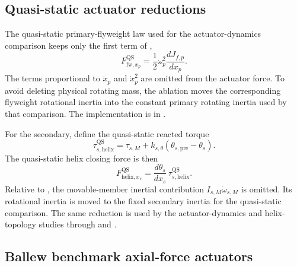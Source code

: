 \documentclass[11pt]{report}
\numberwithin{equation}{section}
\begin{document}
\subsection{Quasi-static actuator reductions}
\label{app:results_quasistatic_actuators}

The quasi-static primary-flyweight law used for the actuator-dynamics
comparison keeps only the first term of
,
\begin{equation}
F_{\mathrm{fw},x_p}^{\mathrm{QS}}
=
\frac{1}{2}\omega_p^2\frac{dJ_{f,p}}{dx_p}.
\label{eq:results_qs_flyweight_force}
\end{equation}
The terms proportional to \(\ddot x_p\) and \(\dot x_p^2\) are omitted from
the actuator force. To avoid deleting physical rotating mass, the ablation
moves the corresponding flyweight rotational inertia into the constant
primary rotating inertia used by that comparison. The implementation is in
.

For the secondary, define the quasi-static reacted torque
\begin{equation}
\tau_{s,\mathrm{helix}}^{\mathrm{QS}}
=
\tau_{s,M}
+k_{s,\theta}\left(\theta_{s,\mathrm{pre}}-\theta_s\right).
\label{eq:results_qs_helix_torque}
\end{equation}
The quasi-static helix closing force is then
\begin{equation}
F_{\mathrm{helix},x_s}^{\mathrm{QS}}
=
\frac{d\theta_s}{dx_s}\,
\tau_{s,\mathrm{helix}}^{\mathrm{QS}}.
\label{eq:results_qs_helix_force}
\end{equation}
Relative to , the movable-member
inertial contribution
\(I_{s,M}\dot\omega_{s,M}\) is omitted. Its rotational inertia is moved to
the fixed secondary inertia for the quasi-static comparison. The same
reduction is used by the actuator-dynamics and helix-topology studies through
and
.

\subsection{Ballew benchmark axial-force actuators}
\label{app:ballew_actuator_implementations}
\end{document}
